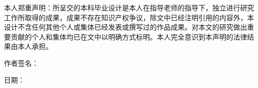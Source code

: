 
\begin{declarationzh}

本人郑重声明：所呈交的本科毕业设计是本人在指导老师的指导下，独立进行研究工作所取得的成果，成果不存在知识产权争议，除文中已经注明引用的内容外，本设计不含任何其他个人或集体已经发表或撰写过的作品成果。对本文的研究做出重要贡献的个人和集体均已在文中以明确方式标明。本人完全意识到本声明的法律结果由本人承担。

\vspace{30pt}
\begin{flushright}
作者签名：\underline{\hspace{3cm}}\qquad\par
日\qquad 期：\underline{\hspace{3cm}}\qquad
\end{flushright}

\end{declarationzh}
